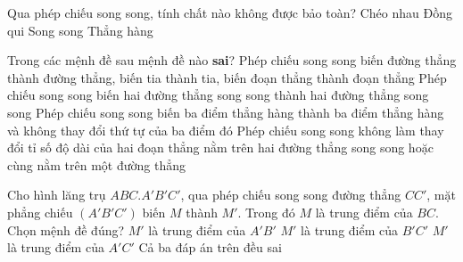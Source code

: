 \begin{ex}%
	Qua phép chiếu song song, tính chất nào không được bảo toàn?
	\choice
	{\True Chéo nhau}
	{Đồng qui}
	{Song song}
	{Thẳng hàng}
\end{ex}
\begin{ex}%
	Trong các mệnh đề sau mệnh đề nào \textbf{sai}?
	\choice
	{Phép chiếu song song biến đường thẳng thành đường thẳng, biến tia thành tia, biến đoạn thẳng thành đoạn thẳng}
	{\True Phép chiếu song song biến hai đường thẳng song song thành hai đường thẳng song song}
	{Phép chiếu song song biến ba điểm thẳng hàng thành ba điểm thẳng hàng và không thay đổi thứ tự của ba điểm đó}
	{Phép chiếu song song không làm thay đổi tỉ số độ dài của hai đoạn thẳng nằm trên hai đường thẳng song song hoặc cùng nằm trên một đường thẳng}
\end{ex}
\begin{ex}%
	Cho hình lăng trụ $ABC.A'B'C'$, qua phép chiếu song song đường thẳng $CC'$, mặt phẳng chiếu $\left( A'B'C' \right)$ biến $M$ thành $M'$. Trong đó $M$ là trung điểm của $BC$. Chọn mệnh đề đúng?
	\choice
	{$M'$ là trung điểm của $A'B'$}
	{\True $M'$ là trung điểm của $B'C'$}
	{$M'$ là trung điểm của $A'C'$}
	{Cả ba đáp án trên đều sai}
\end{ex}
